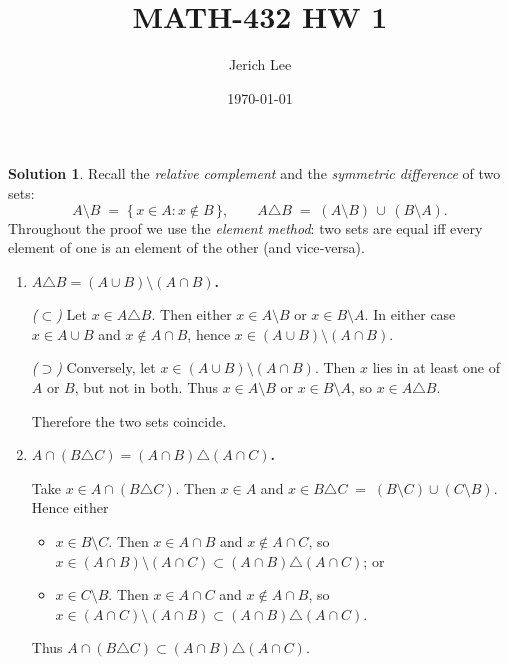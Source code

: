 \documentclass[12pt]{article}
\title{MATH-432 HW 1}
\author{Jerich Lee}
\date{\today}
\theoremstyle{definition} %
\newtheorem{solution}{Solution}
\theoremstyle{plain} %
\begin{document}
\maketitle
\begin{solution}
  Recall the \emph{relative complement} and the \emph{symmetric difference} of two sets:
  \[
  A\setminus B \;=\;\{\,x\in A : x\notin B\,\},
  \qquad
  A\triangle B \;=\;(A\setminus B)\,\cup\,(B\setminus A).
  \]
  Throughout the proof we use the \emph{element method}: two sets are equal
  iff every element of one is an element of the other (and vice‐versa).
  
  \begin{enumerate}[label=(\alph*)]
  
  \item \textbf{$A\triangle B=(A\cup B)\setminus(A\cap B)$.}
  
  \smallskip
  \textit{($\subset$)}  
  Let $x\in A\triangle B$.  
  Then either
  \(
  x\in A\setminus B
  \)
  or
  \(
  x\in B\setminus A.
  \)
  In either case $x\in A\cup B$ and $x\notin A\cap B$, hence
  \(x\in(A\cup B)\setminus(A\cap B)\).
  
  \smallskip
  \textit{($\supset$)}  
  Conversely, let
  \(x\in(A\cup B)\setminus(A\cap B)\).
  Then $x$ lies in at least one of $A$ or $B$, but not in both.
  Thus $x\in A\setminus B$ or $x\in B\setminus A$,
  so \(x\in A\triangle B\).
  
  \smallskip
  Therefore the two sets coincide.
  
  \item \textbf{$A\cap(B\triangle C) = (A\cap B)\triangle(A\cap C)$.}
  
  Take $x\in A\cap(B\triangle C)$.  Then $x\in A$ and
  \(
  x\in B\triangle C\;=\;(B\setminus C)\cup(C\setminus B).
  \)
  Hence either
  
  \begin{itemize}
    \item $x\in B\setminus C$.  
          Then $x\in A\cap B$ and $x\notin A\cap C$, so
          \(x\in(A\cap B)\setminus(A\cap C)\subset (A\cap B)\triangle(A\cap C)\); or
    \item $x\in C\setminus B$.  
          Then $x\in A\cap C$ and $x\notin A\cap B$, so
          \(x\in(A\cap C)\setminus(A\cap B)\subset (A\cap B)\triangle(A\cap C)\).
  \end{itemize}
  Thus \(A\cap(B\triangle C)\subset (A\cap B)\triangle(A\cap C)\).
  

\end{enumerate}
\end{solution}
\end{document}
